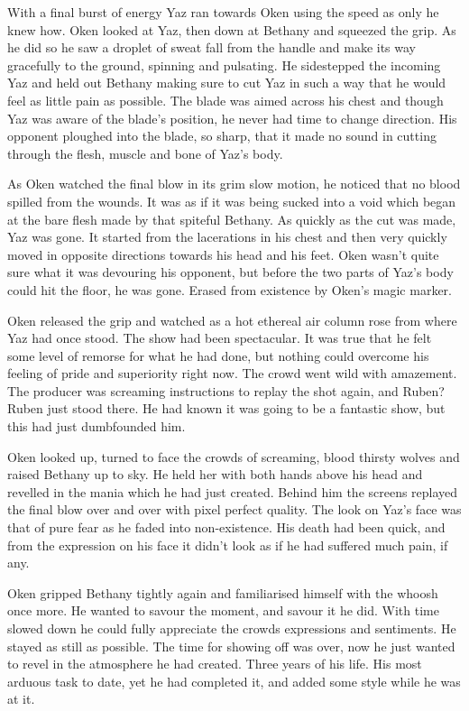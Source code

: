 With a final burst of energy Yaz ran towards Oken using the speed as only he knew how. Oken looked at Yaz, then down at Bethany and squeezed the grip. As he did so he saw a droplet of sweat fall from the handle and make its way gracefully to the ground, spinning and pulsating. He sidestepped the incoming Yaz and held out Bethany making sure to cut Yaz in such a way that he would feel as little pain as possible. The blade was aimed across his chest and though Yaz was aware of the blade's position, he never had time to change direction. His opponent ploughed into the blade, so sharp, that it made no sound in cutting through the flesh, muscle and bone of Yaz's body.

As Oken watched the final blow in its grim slow motion, he noticed that no blood spilled from the wounds. It was as if it was being sucked into a void which began at the bare flesh made by that spiteful Bethany. As quickly as the cut was made, Yaz was gone. It started from the lacerations in his chest and then very quickly moved in opposite directions towards his head and his feet. Oken wasn't quite sure what it was devouring his opponent, but before the two parts of Yaz's body could hit the floor, he was gone. Erased from existence by Oken's magic marker.

Oken released the grip and watched as a hot ethereal air column rose from where Yaz had once stood. The show had been spectacular. It was true that he felt some level of remorse for what he had done, but nothing could overcome his feeling of pride and superiority right now. The crowd went wild with amazement. The producer was screaming instructions to replay the shot again, and Ruben? Ruben just stood there. He had known it was going to be a fantastic show, but this had just dumbfounded him.

Oken looked up, turned to face the crowds of screaming, blood thirsty wolves and raised Bethany up to sky. He held her with both hands above his head and revelled in the mania which he had just created. Behind him the screens replayed the final blow over and over with pixel perfect quality. The look on Yaz's face was that of pure fear as he faded into non-existence. His death had been quick, and from the expression on his face it didn't look as if he had suffered much pain, if any.

Oken gripped Bethany tightly again and familiarised himself with the whoosh once more. He wanted to savour the moment, and savour it he did. With time slowed down he could fully appreciate the crowds expressions and sentiments. He stayed as still as possible. The time for showing off was over, now he just wanted to revel in the atmosphere he had created. Three years of his life. His most arduous task to date, yet he had completed it, and added some style while he was at it.

